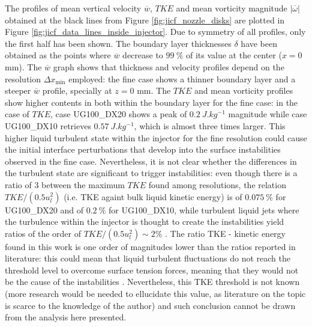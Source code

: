 The profiles of mean vertical velocity $\overline{w}$, $TKE$ and mean vorticity magnitude $|\overline{\omega}|$ obtained at the black lines from Figure \ref{fig:jicf_nozzle_disks} are plotted in Figure \ref{fig:jicf_data_lines_inside_injector}. Due to symmetry of all profiles, only the first half has been shown. The boundary layer thicknesses $\delta$ have been obtained as the points where $\overline{w}$ decrease to $99~\%$ of its value at the center ($x = 0$ mm). The $\overline{w}$ graph shows that thickness and velocity profiles depend on the resolution $\Delta x_\mathrm{min}$ employed: the fine case shows a thinner boundary layer and a steeper $\overline{w}$ profile, specially at $z = 0$ mm. The $TKE$ and mean vorticity profiles show higher contents in both within the boundary layer for the fine case: in the case of $TKE$, case UG100\_DX20 shows a peak of $0.2~J.kg^{-1}$ magnitude while case UG100\_DX10 retrieves $0.57~J.kg^{-1}$, which is almost three times larger. This higher liquid turbulent state within the injector for the fine resolution could cause the initial interface perturbations that develop into the surface instabilities observed in the fine case. Nevertheless, it is not clear whether the differences in the turbulent state are significant to trigger instabilities: even though there is a ratio of 3 between the maximum $TKE$ found among resolutions, the relation $TKE/ \left( 0.5 u_l^2 \right)$ (i.e. TKE againt bulk liquid kinetic energy) is of $0.075~\%$ for UG100\_DX20 and of $0.2~\%$ for UG100\_DX10, while turbulent liquid jets where the turbulence within the injector is thought to create the instabilities  yield ratios of the order of $TKE/ \left( 0.5 u_l^2 \right) \sim 2 \%$ . The ratio TKE - kinetic energy found in this work is one order of magnitudes lower than the ratios reported in literature: this could mean that liquid turbulent fluctuations do not reach the threshold level to overcome surface tension forces, meaning that they would not be the cause of the instabilities . Nevertheless, this TKE threshold is not known (more research would be needed to ellucidate this value, as literature on the topic is scarce to the knowledge of the author) and such conclusion cannot be drawn from the analysis here presented.


